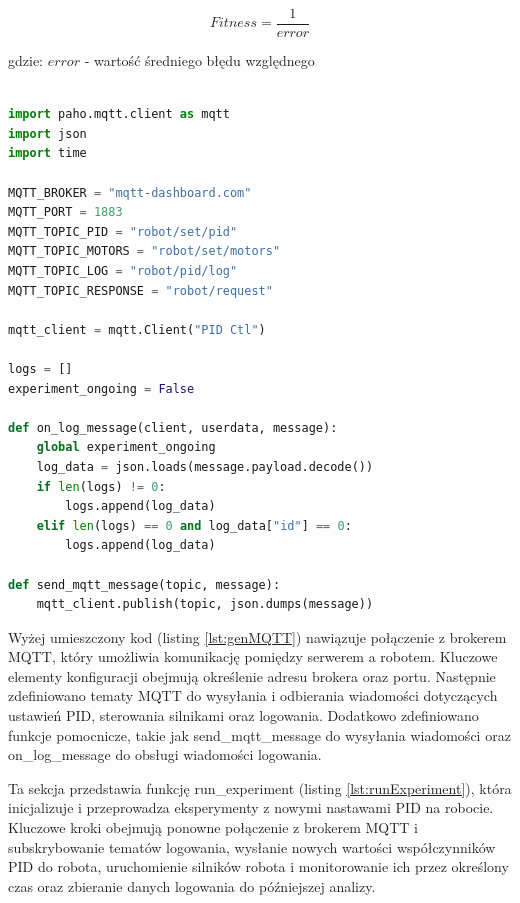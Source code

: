 \documentclass[12pt,twoside]{article}
\begin{document}
\begin{equation}
Fitness = \frac{1}{error}
\label{Eq:fitness}
\end{equation}

gdzie: $error$ - wartość średniego błędu względnego \\ \\

\newpage

\begin{lstlisting}[language=Python, caption=Konfiguracja MQTT, label={lst:genMQTT}]
import paho.mqtt.client as mqtt
import json
import time

MQTT_BROKER = "mqtt-dashboard.com"
MQTT_PORT = 1883
MQTT_TOPIC_PID = "robot/set/pid"
MQTT_TOPIC_MOTORS = "robot/set/motors"
MQTT_TOPIC_LOG = "robot/pid/log"
MQTT_TOPIC_RESPONSE = "robot/request"

mqtt_client = mqtt.Client("PID Ctl")

logs = []
experiment_ongoing = False

def on_log_message(client, userdata, message):
    global experiment_ongoing
    log_data = json.loads(message.payload.decode())
    if len(logs) != 0: 
        logs.append(log_data) 
    elif len(logs) == 0 and log_data["id"] == 0:
        logs.append(log_data)

def send_mqtt_message(topic, message):
    mqtt_client.publish(topic, json.dumps(message))
\end{lstlisting}

Wyżej umieszczony kod (listing \ref{lst:genMQTT}) nawiązuje połączenie z brokerem MQTT, który umożliwia komunikację pomiędzy serwerem a robotem. Kluczowe elementy konfiguracji obejmują określenie adresu brokera oraz portu. Następnie zdefiniowano tematy MQTT do wysyłania i odbierania wiadomości dotyczących ustawień PID, sterowania silnikami oraz logowania. Dodatkowo zdefiniowano funkcje pomocnicze, takie jak send\_mqtt\_message do wysyłania wiadomości oraz on\_log\_message do obsługi wiadomości logowania.

Ta sekcja przedstawia funkcję run\_experiment (listing \ref{lst:runExperiment}), która inicjalizuje i przeprowadza eksperymenty z nowymi nastawami PID na robocie. Kluczowe kroki obejmują ponowne połączenie z brokerem MQTT i subskrybowanie tematów logowania, wysłanie nowych wartości współczynników PID do robota, uruchomienie silników robota i monitorowanie ich przez określony czas oraz zbieranie danych logowania do późniejszej analizy.
\end{document}
